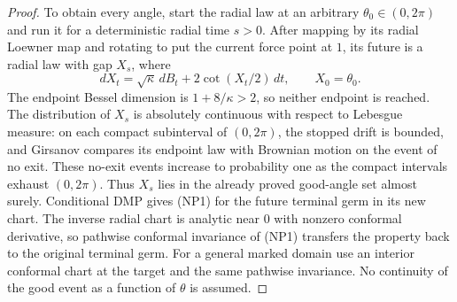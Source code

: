 \documentclass[11pt]{article}
\theoremstyle{definition}\newtheorem{definition}[theorem]{Definition}
\theoremstyle{remark}\newtheorem{remark}[theorem]{Remark}
\begin{document}
\begin{proof}
To obtain every angle, start the radial law at an arbitrary
$\theta_0\in(0,2\pi)$ and run it for a deterministic radial time
$s>0$. After mapping by its radial Loewner map and rotating to put
the current force point at $1$, its future is a radial law with
gap $X_s$, where
\[
 dX_t=\sqrt\kappa\,dB_t+2\cot(X_t/2)\,dt,
 \qquad X_0=\theta_0.
 \tag{NP4}
\]
The endpoint Bessel dimension is $1+8/\kappa>2$, so neither endpoint
is reached. The distribution of $X_s$ is absolutely continuous with
respect to Lebesgue measure: on each compact subinterval of $(0,2\pi)$,
the stopped drift is bounded, and Girsanov compares its endpoint law
with Brownian motion on the event of no exit. These no-exit events
increase to probability one as the compact intervals exhaust
$(0,2\pi)$. Thus $X_s$ lies in the already proved good-angle set
almost surely. Conditional DMP gives (NP1) for the future terminal
germ in its new chart. The inverse radial chart is analytic near $0$
with nonzero conformal derivative, so pathwise conformal invariance
of (NP1) transfers the property back to the original terminal germ.
For a general marked domain use an interior conformal chart at the
target and the same pathwise invariance. No continuity of the good
event as a function of $\theta$ is assumed.
\end{proof}
\end{document}
